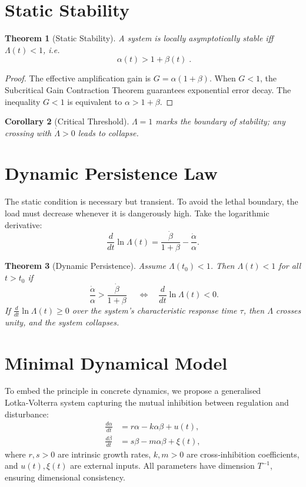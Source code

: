 \documentclass[11pt]{article}
\newtheorem{theorem}{Theorem}[section]
\newtheorem{corollary}[theorem]{Corollary}
\begin{document}
\section{Static Stability}
\label{sec:static}
\begin{theorem}[Static Stability]\label{thm:static}
A system is locally asymptotically stable iff \(\Lambda(t)<1\), i.e.
\[
\boxed{\;\alpha(t) > 1+\beta(t)\;}.
\]
\end{theorem}
\begin{proof}
The effective amplification gain is \(G = \alpha(1+\beta)\). When \(G<1\), the Subcritical Gain Contraction Theorem guarantees exponential error decay. The inequality \(G<1\) is equivalent to \(\alpha>1+\beta\).
\end{proof}

\begin{corollary}[Critical Threshold]
\(\Lambda=1\) marks the boundary of stability; any crossing with \(\dot\Lambda>0\) leads to collapse.
\end{corollary}

\section{Dynamic Persistence Law}
\label{sec:dynamic}
The static condition is necessary but transient. To avoid the lethal boundary, the load must decrease whenever it is dangerously high.
Take the logarithmic derivative:
\[
\frac{d}{dt}\ln\Lambda(t) = \frac{\dot\beta}{1+\beta} - \frac{\dot\alpha}{\alpha}.
\]

\begin{theorem}[Dynamic Persistence]\label{thm:dynamic}
Assume \(\Lambda(t_0)<1\). Then \(\Lambda(t)<1\) for all \(t>t_0\) if
\[
\boxed{\;\frac{\dot\alpha}{\alpha} > \frac{\dot\beta}{1+\beta}\;}
\quad\Longleftrightarrow\quad
\frac{d}{dt}\ln\Lambda(t) < 0 .
\]
If \(\frac{d}{dt}\ln\Lambda(t)\ge 0\) over the system's characteristic response time \(\tau\), then \(\Lambda\) crosses unity, and the system collapses.
\end{theorem}

\section{Minimal Dynamical Model}
\label{sec:model}
To embed the principle in concrete dynamics, we propose a generalised Lotka‑Volterra system capturing the mutual inhibition between regulation and disturbance:
\[
\boxed{
\begin{aligned}
\frac{d\alpha}{dt} &= r\alpha - k\alpha\beta + u(t),\\[4pt]
\frac{d\beta}{dt} &= s\beta - m\alpha\beta + \xi(t),
\end{aligned}}
\]
where \(r,s>0\) are intrinsic growth rates, \(k,m>0\) are cross‑inhibition coefficients, and \(u(t),\xi(t)\) are external inputs. All parameters have dimension \(T^{-1}\), ensuring dimensional consistency.
\end{document}
